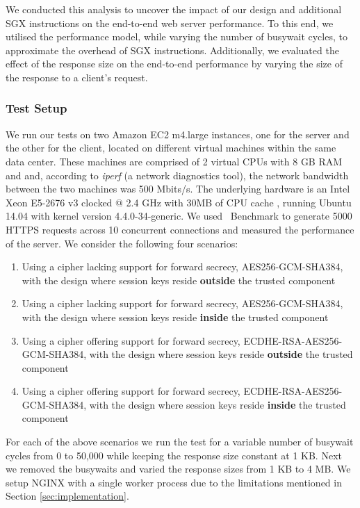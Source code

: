 \documentclass[../../../main.tex]{subfiles}
\begin{document}
\label{sec:endtoend}
We conducted this analysis to uncover the impact of our design and additional SGX instructions on the end-to-end web server performance. To this end, we
utilised the performance model, while varying the number of busywait
cycles, to approximate the overhead of SGX instructions. Additionally,
we evaluated the effect of the response size on the end-to-end performance by
varying the size of the response to a client's request.

\subsubsection*{Test Setup}
We run our tests on two Amazon EC2 m4.large instances, one for the
server and the other for the client, located on different virtual
machines within the same data center. These machines are comprised of
2 virtual CPUs with 8 GB RAM and and, according to \textit{iperf} (a
network diagnostics tool), the network bandwidth between the two
machines was 500 Mbits/s. The underlying hardware is an Intel Xeon
E5-2676 v3 clocked @ 2.4 GHz with 30MB of CPU cache
\cite{aws_instances}, running Ubuntu 14.04 with kernel version
4.4.0-34-generic. We used \Apache~Benchmark to generate 5000 HTTPS
requests across 10 concurrent connections and measured the performance
of the server. We consider the following four scenarios:
\begin{enumerate}
  \item Using a cipher lacking support for forward secrecy, AES256-GCM-SHA384,
    with the design where session keys reside \textbf{outside} the trusted
    component
  \item Using a cipher lacking support for forward secrecy, AES256-GCM-SHA384,
    with the design where session keys reside \textbf{inside} the trusted
    component
  \item Using a cipher offering support for forward secrecy,
    ECDHE-RSA-AES256-GCM-SHA384, with the design where session keys reside
    \textbf{outside} the trusted component
  \item Using a cipher offering support for forward secrecy,
    ECDHE-RSA-AES256-GCM-SHA384, with the design where session keys reside
    \textbf{inside} the trusted component
\end{enumerate}

For each of the above scenarios we run the test for a variable number
of busywait cycles from 0 to 50,000 while keeping the response size constant at 1 KB. Next we removed the busywaits and varied the response sizes from 1 KB to 4 MB. We setup NGINX with a single worker process due to the
limitations mentioned in Section \ref{sec:implementation}.
\end{document}
